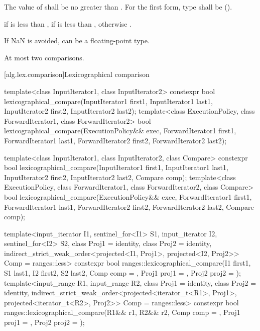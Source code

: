 \begin{itemdescr}
\pnum
\requires
The value of  shall be no greater than .
For the first form, type 
shall be  ().

\pnum
\returns
{} if  is less than ,
 if  is less than ,
otherwise .

\pnum
\begin{note}
If NaN is avoided,  can be a floating-point type.
\end{note}

\pnum
\complexity
At most two comparisons.
\end{itemdescr}

[alg.lex.comparison]{Lexicographical comparison}

%
\begin{itemdecl}
template<class InputIterator1, class InputIterator2>
  constexpr bool
    lexicographical_compare(InputIterator1 first1, InputIterator1 last1,
                            InputIterator2 first2, InputIterator2 last2);
template<class ExecutionPolicy, class ForwardIterator1, class ForwardIterator2>
  bool
    lexicographical_compare(ExecutionPolicy&& exec,
                            ForwardIterator1 first1, ForwardIterator1 last1,
                            ForwardIterator2 first2, ForwardIterator2 last2);

template<class InputIterator1, class InputIterator2, class Compare>
  constexpr bool
    lexicographical_compare(InputIterator1 first1, InputIterator1 last1,
                            InputIterator2 first2, InputIterator2 last2,
                            Compare comp);
template<class ExecutionPolicy, class ForwardIterator1, class ForwardIterator2,
         class Compare>
  bool
    lexicographical_compare(ExecutionPolicy&& exec,
                            ForwardIterator1 first1, ForwardIterator1 last1,
                            ForwardIterator2 first2, ForwardIterator2 last2,
                            Compare comp);

template<input_iterator I1, sentinel_for<I1> S1, input_iterator I2, sentinel_for<I2> S2,
         class Proj1 = identity, class Proj2 = identity,
         indirect_strict_weak_order<projected<I1, Proj1>,
                                    projected<I2, Proj2>> Comp = ranges::less>
  constexpr bool
    ranges::lexicographical_compare(I1 first1, S1 last1, I2 first2, S2 last2,
                                    Comp comp = {}, Proj1 proj1 = {}, Proj2 proj2 = {});
template<input_range R1, input_range R2, class Proj1 = identity,
         class Proj2 = identity,
         indirect_strict_weak_order<projected<iterator_t<R1>, Proj1>,
                                    projected<iterator_t<R2>, Proj2>> Comp = ranges::less>
  constexpr bool
    ranges::lexicographical_compare(R1&& r1, R2&& r2, Comp comp = {},
                                    Proj1 proj1 = {}, Proj2 proj2 = {});
\end{itemdecl}

